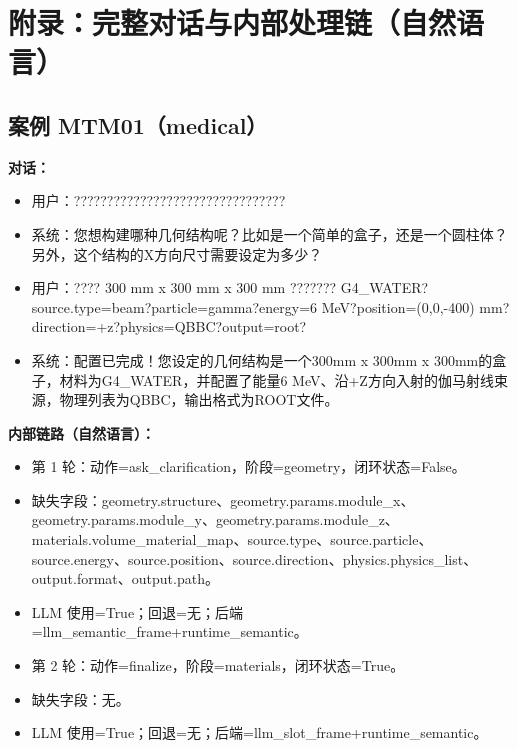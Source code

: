 \documentclass[11pt]{ctexart}
\begin{document}
\section{附录：完整对话与内部处理链（自然语言）}
\subsection{案例 MTM01（medical）}
\textbf{对话：}
\begin{itemize}
\item 用户：????????????????????????????????
\item 系统：您想构建哪种几何结构呢？比如是一个简单的盒子，还是一个圆柱体？另外，这个结构的X方向尺寸需要设定为多少？
\item 用户：???? 300 mm x 300 mm x 300 mm ??????? G4\_WATER?source.type=beam?particle=gamma?energy=6 MeV?position=(0,0,-400) mm?direction=+z?physics=QBBC?output=root?
\item 系统：配置已完成！您设定的几何结构是一个300mm x 300mm x 300mm的盒子，材料为G4\_WATER，并配置了能量6 MeV、沿+Z方向入射的伽马射线束源，物理列表为QBBC，输出格式为ROOT文件。
\end{itemize}
\textbf{内部链路（自然语言）：}
\begin{itemize}
\item 第 1 轮：动作=ask\_clarification，阶段=geometry，闭环状态=False。
\item 缺失字段：geometry.structure、geometry.params.module\_x、geometry.params.module\_y、geometry.params.module\_z、materials.volume\_material\_map、source.type、source.particle、source.energy、source.position、source.direction、physics.physics\_list、output.format、output.path。
\item LLM 使用=True；回退=无；后端=llm\_semantic\_frame+runtime\_semantic。
\item 第 2 轮：动作=finalize，阶段=materials，闭环状态=True。
\item 缺失字段：无。
\item LLM 使用=True；回退=无；后端=llm\_slot\_frame+runtime\_semantic。
\end{itemize}
\end{document}
